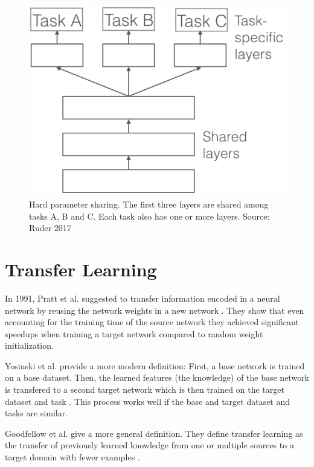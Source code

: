 \begin{figure}[ht]
	\centering
	\includegraphics[scale=0.5]{figures/03_theory/03_mtl_architecture}
	\caption{Hard parameter sharing. The first three layers are shared among tasks A, B and C. Each task also has one or more layers. Source: Ruder 2017 \cite{Ruder2017}}
	\label{fig:03_mtl_architecture}
\end{figure}



\section{Transfer Learning}
\label{sec:TransferLearning}

In 1991, Pratt et al. suggested to transfer information encoded in a neural network by reusing the network weights in a new network \cite{Pratt1991}. They show that even accounting for the training time of the source network they achieved significant speedups when training a target network compared to random weight initialization.

Yosinski et al. provide a more modern definition: First, a base network is trained on a base dataset. Then, the learned features {(the knowledge)} of the base network is transfered to a second target network which is then trained on the target dataset and task \cite{Yosinski2014}. This process works well if the base and target dataset and tasks are similar.

Goodfellow et al. give a more general definition. They define transfer learning as the transfer of previously learned knowledge from one or multiple sources to a target domain with fewer examples \cite{Goodfellow2016}.

